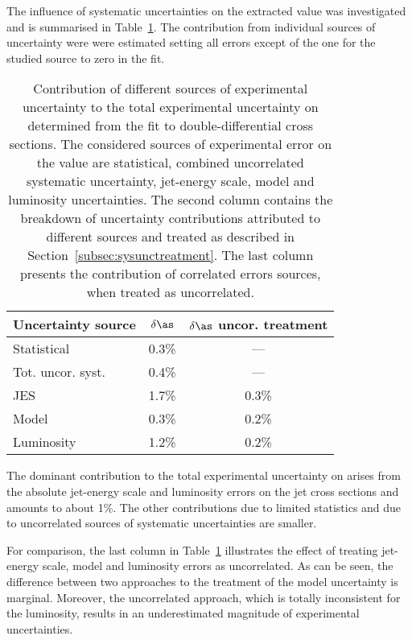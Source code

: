 The influence of systematic uncertainties on the extracted \asz value was investigated and is summarised in Table~\ref{tab:asuncbreakdown}. The contribution from individual sources of uncertainty were were estimated setting all errors except of the one for the studied source to zero in the \as fit.
\begin{table}
\centering
\begin{tabular}{|l|c|c|}
 \hline
 Uncertainty source & $\delta\as$ & $\delta\as$ uncor. treatment\\
 \hline\hline
 Statistical       & 0.3\% & ---     \\
 Tot. uncor. syst. & 0.4\% & ---     \\
 JES               & 1.7\% & 0.3\%   \\
 Model               & 0.3\% & 0.2\%   \\
 Luminosity        & 1.2\% & 0.2\%   \\
 \hline
\end{tabular}
\caption{Contribution of different sources of experimental uncertainty to the total experimental uncertainty on \asz determined from the fit to double-differential cross sections. The considered sources of experimental error on the \asz value are statistical, combined uncorrelated systematic uncertainty, jet-energy scale, model and luminosity uncertainties. The second column contains the breakdown of uncertainty contributions attributed to different sources and treated as described in Section~\ref{subsec:sysunctreatment}. The last column presents the contribution of correlated errors sources, when treated as uncorrelated.}
\label{tab:asuncbreakdown}
\end{table}

The dominant contribution to the total experimental uncertainty on \as arises from the absolute jet-energy scale and luminosity errors on the jet cross sections and amounts to about 1\%. The other contributions due to limited statistics and due to uncorrelated sources of systematic uncertainties are smaller. 

For comparison, the last column in Table~\ref{tab:asuncbreakdown} illustrates the effect of treating jet-energy scale, model and luminosity errors as uncorrelated. As can be seen, the difference between two approaches to the treatment of the model uncertainty is marginal. Moreover, the uncorrelated approach, which is totally inconsistent for the luminosity, results in an underestimated magnitude of experimental uncertainties. 